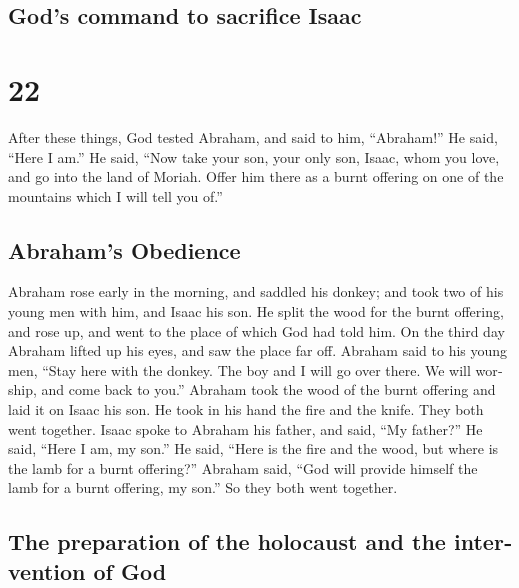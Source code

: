 \begin{paracol}{2}
\switchcolumn
\begin{otherlanguage}{english}

\hypertarget{gods-command-to-sacrifice-isaac}{%
\subsection{God's command to sacrifice
Isaac}\label{gods-command-to-sacrifice-isaac}}

\hypertarget{section-43}{%
\section{22}\label{section-43}}

 After these things, God tested Abraham, and said to him,
``Abraham!'' He said, ``Here I am.''  He said, ``Now take
your son, your only son, Isaac, whom you love, and go into the land of
Moriah. Offer him there as a burnt offering on one of the mountains
which I will tell you of.''

\hypertarget{abrahams-obedience}{%
\subsection{Abraham's Obedience}\label{abrahams-obedience}}

 Abraham rose early in the morning, and saddled his
donkey; and took two of his young men with him, and Isaac his son. He
split the wood for the burnt offering, and rose up, and went to the
place of which God had told him.  On the third day Abraham
lifted up his eyes, and saw the place far off.  Abraham
said to his young men, ``Stay here with the donkey. The boy and I will
go over there. We will worship, and come back to you.'' 
Abraham took the wood of the burnt offering and laid it on Isaac his
son. He took in his hand the fire and the knife. They both went
together.  Isaac spoke to Abraham his father, and said,
``My father?'' He said, ``Here I am, my son.'' He said, ``Here is the
fire and the wood, but where is the lamb for a burnt offering?''
 Abraham said, ``God will provide himself the lamb for a
burnt offering, my son.'' So they both went together.

\hypertarget{the-preparation-of-the-holocaust-and-the-intervention-of-god}{%
\subsection{The preparation of the holocaust and the intervention of
God}\label{the-preparation-of-the-holocaust-and-the-intervention-of-god}}


\end{otherlanguage}
\end{paracol}
